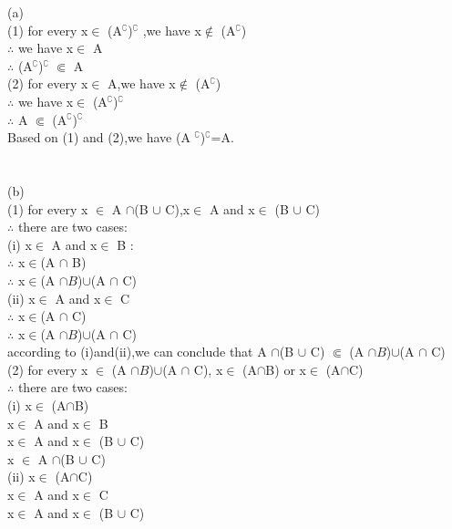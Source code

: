 \documentclass[11pt, a4paper, UTF8]{ctexart}
\begin{document}
\begin{solution}
(a)\\
(1) for every x$\in$ (A$^\complement$)$^\complement$ ,we have x$\notin$ (A$^\complement$)\\
$\therefore$ we have x$\in$ A\\
$\therefore$ (A$^\complement$)$^\complement$ $\Subset$ A\\
(2) for every x$\in$ A,we have x$\notin$ (A$^\complement$)\\
$\therefore$ we have x$\in$ (A$^\complement$)$^\complement$\\
$\therefore$  A $\Subset$ (A$^\complement$)$^\complement$\\
Based on (1) and (2),we have (A $^\complement$)$^\complement$=A.\\
\\
\\
(b)\\
(1) for every x $\in$ A $\cap$(B $\cup$ C),x$\in$ A and x$\in$ (B $\cup$ C)\\
$\therefore$ there are two cases:\\
\indent (i) x$\in$ A and x$\in$ B :\\
\indent \indent $\therefore$ x$\in$(A $\cap$ B)\\
\indent \indent $\therefore$ x$\in$(A $\cap B$)$\cup$(A $\cap$ C)\\
\indent (ii) x$\in$ A and x$\in$ C\\
\indent \indent $\therefore$ x$\in$(A $\cap$ C)\\
\indent \indent $\therefore$ x$\in$(A $\cap B$)$\cup$(A $\cap$ C)\\
according to (i)and(ii),we can conclude that A $\cap$(B $\cup$ C) $\Subset$ (A $\cap B$)$\cup$(A $\cap$ C)\\
(2) for every x $\in$ (A $\cap B$)$\cup$(A $\cap$ C), x$\in$ (A$\cap$B) or x$\in$ (A$\cap$C)\\
$\therefore$ there are two cases:\\
\indent (i) x$\in$ (A$\cap$B)\\
\indent \indent x$\in$ A and x$\in$ B\\
\indent \indent x$\in$ A and x$\in$ (B $\cup$ C)\\
\indent \indent x $\in$ A $\cap$(B $\cup$ C)\\
\indent (ii) x$\in$ (A$\cap$C)\\
\indent \indent x$\in$ A and x$\in$ C\\
\indent \indent x$\in$ A and x$\in$ (B $\cup$ C)\\

\end{solution}
\end{document}
